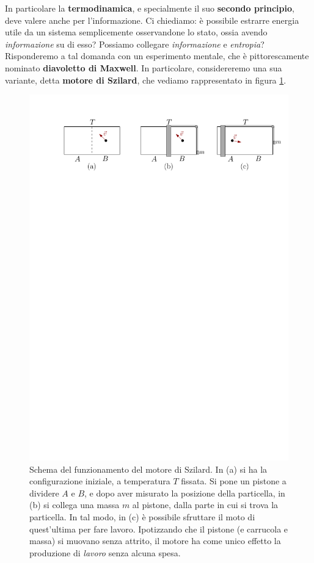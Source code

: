 \documentclass[../../InformazioneQuantistica.tex]{subfiles}
\begin{document}
In particolare la \textbf{termodinamica}, e specialmente il suo \textbf{secondo principio}, deve valere anche per l'informazione. Ci chiediamo: è possibile estrarre energia utile da un sistema semplicemente osservandone lo stato, ossia avendo \textit{informazione} su di esso? \cite{landauer} Possiamo collegare \textit{informazione} e \textit{entropia}?\\

Risponderemo a tal domanda con un esperimento mentale, che è pittorescamente nominato \textbf{diavoletto di Maxwell}. In particolare, considereremo una sua variante, detta \textbf{motore di Szilard}, che vediamo rappresentato in figura \ref{fig:szilard}.

\begin{figure}[t]
\centering
\includegraphics[scale=0.8]{Immagini/27_2/Svilards_engine.pdf}
\caption{Schema del funzionamento del motore di Szilard. In (a) si ha la configurazione iniziale, a temperatura $T$ fissata. Si pone un pistone a dividere $A$ e $B$, e dopo aver misurato la posizione della particella, in (b) si collega una massa $m$ al pistone, dalla parte in cui si trova la particella. In tal modo, in (c) è possibile sfruttare il moto di quest'ultima per fare lavoro. Ipotizzando che il pistone (e carrucola e massa) si muovano senza attrito, il motore ha come unico effetto la produzione di \textit{lavoro} senza alcuna spesa.\label{fig:szilard}}
\end{figure}
\end{document}
